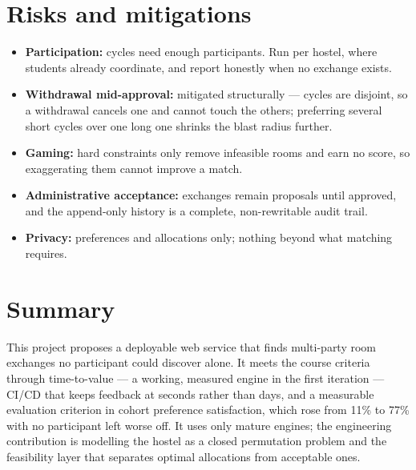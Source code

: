\documentclass[11pt,a4paper]{article}
\begin{document}
\section{Risks and mitigations}
\begin{itemize}[leftmargin=0.7cm]
    \item \textbf{Participation:} cycles need enough
      participants. Run per hostel, where students
      already coordinate, and report honestly when no
      exchange exists.
    \item \textbf{Withdrawal mid-approval:} mitigated
      structurally --- cycles are disjoint, so a
      withdrawal cancels one and cannot touch the
      others; preferring several short cycles over one
      long one shrinks the blast radius further.
    \item \textbf{Gaming:} hard constraints only remove
      infeasible rooms and earn no score, so
      exaggerating them cannot improve a match.
    \item \textbf{Administrative acceptance:} exchanges
      remain proposals until approved, and the
      append-only history is a complete, non-rewritable
      audit trail.
    \item \textbf{Privacy:} preferences and allocations
      only; nothing beyond what matching requires.
\end{itemize}

\section{Summary}
This project proposes a deployable web service that
finds multi-party room exchanges no participant could
discover alone. It meets the course criteria through
time-to-value --- a working, measured engine in the first
iteration --- CI/CD that keeps feedback at seconds rather
than days, and a measurable evaluation criterion in
cohort preference satisfaction, which rose from 11\% to
77\% with no participant left worse off. It uses only
mature engines; the engineering contribution is
modelling the hostel as a closed permutation problem and
the feasibility layer that separates optimal allocations
from acceptable ones.
\end{document}
